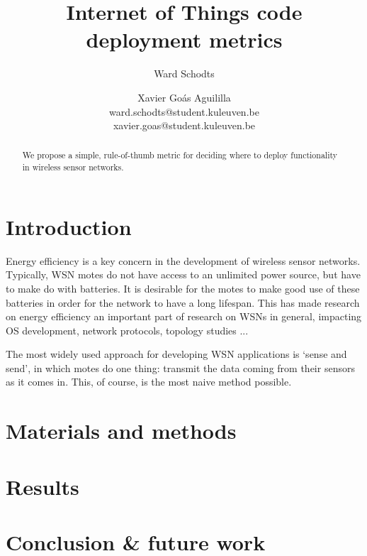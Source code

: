 \documentclass{article}
\title{Internet of Things code deployment metrics}
\author{Ward Schodts \and Xavier Go\'as Aguililla \\ ward.schodts@student.kuleuven.be \\ xavier.goas@student.kuleuven.be}
\begin{document}
\maketitle

\begin{abstract}
We propose a simple, rule-of-thumb metric for deciding where to deploy
functionality in wireless sensor networks. 
  
\lipsum[1]
\end{abstract}

\section{Introduction}


Energy efficiency is a key concern in the development of wireless
sensor networks. Typically, WSN motes do not have access to an
unlimited power source, but have to make do with batteries. It is
desirable for the motes to make good use of these batteries in order
for the network to have a long lifespan. This has made research on
energy efficiency an important part of research on WSNs in general,
impacting OS development, network protocols, topology studies ...

The most widely used approach for developing WSN applications is
`sense and send', in which motes do one thing: transmit the data
coming from their sensors as it comes in. This, of course, is the most
naive method possible. 

\section{Materials and methods}

\lipsum[3]

\section{Results}
\lipsum[4]
\section{Conclusion \& future work}

\lipsum[5]



\end{document}
